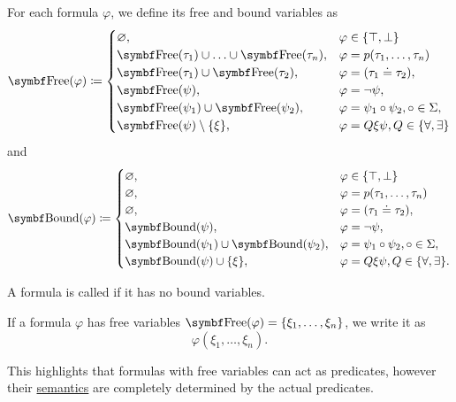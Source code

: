 \begin{definition}
  For each formula \( \varphi \), we define its free and bound variables as
  \begin{equation}\label{def:first_order_formula/free}
    \Bold{Free}(\varphi) \coloneqq \begin{cases}
      \varnothing,                                              & \varphi \in \{ \top, \bot \}                       \\
      \Bold{Free}(\tau_1) \cup \ldots \cup \Bold{Free}(\tau_n), & \varphi = p(\tau_1, \ldots, \tau_n)                \\
      \Bold{Free}(\tau_1) \cup \Bold{Free}(\tau_2),             & \varphi = (\tau_1 \doteq \tau_2),                  \\
      \Bold{Free}(\psi),                                        & \varphi = \neg \psi,                               \\
      \Bold{Free}(\psi_1) \cup \Bold{Free}(\psi_2),             & \varphi = \psi_1 \circ \psi_2, \circ \in \Sigma,   \\
      \Bold{Free}(\psi) \setminus \{ \xi \},                    & \varphi = Q \xi \psi, Q \in \{ \forall, \exists \}
    \end{cases}
  \end{equation}
  and
  \begin{equation}\label{def:first_order_formula/bound}
    \Cat{Bound}(\varphi) \coloneqq \begin{cases}
      \varnothing,                                   & \varphi \in \{ \top, \bot \}                        \\
      \varnothing,                                   & \varphi = p(\tau_1, \ldots, \tau_n)                 \\
      \varnothing,                                   & \varphi = (\tau_1 \doteq \tau_2),                   \\
      \Cat{Bound}(\psi),                             & \varphi = \neg \psi,                                \\
      \Cat{Bound}(\psi_1) \cup \Bold{Bound}(\psi_2), & \varphi = \psi_1 \circ \psi_2, \circ \in \Sigma,    \\
      \Cat{Bound}(\psi) \cup \{ \xi \},              & \varphi = Q \xi \psi, Q \in \{ \forall, \exists \}.
    \end{cases}
  \end{equation}

  A formula is called  if it has no bound variables.

  If a formula \( \varphi \) has free variables \( \Bold{Free}(\varphi) = \{ \xi_1, \ldots, \xi_n \} \), we write it as
  \begin{equation*}
    \varphi(\xi_1, \ldots, \xi_n).
  \end{equation*}

  This highlights that formulas with free variables can act as predicates, however their \hyperref[def:first_order_model]{semantics} are completely determined by the actual predicates.
\end{definition}

